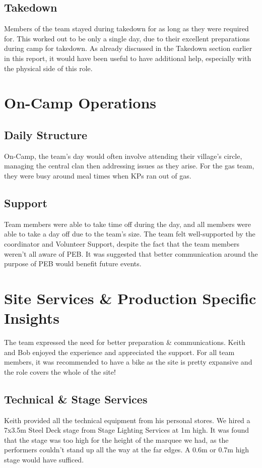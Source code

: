 \subsection{Takedown}
Members of the team stayed during takedown for as long as they were required for. This worked out to be only a single day, due to their excellent preparations during camp for takedown. As already discussed in the Takedown section earlier in this report, it would have been useful to have additional help, especially with the physical side of this role. 

\section{On-Camp Operations}
\subsection{Daily Structure}
On-Camp, the team's day would often involve attending their village's circle, managing the central clan then addressing issues as they arise. For the gas team, they were busy around meal times when KPs ran out of gas. 
\subsection{Support}
Team members were able to take time off during the day, and all members were able to take a day off due to the team's size. The team felt well-supported by the coordinator and Volunteer Support, despite the fact that the team members weren't all aware of PEB. It was suggested that better communication around the purpose of PEB would benefit future events. 

\section{Site Services \& Production Specific Insights}
The team expressed the need for better preparation \& communications. Keith and Bob enjoyed the experience and appreciated the support. For all team members, it was recommended to have a bike as the site is pretty expansive and the role covers the whole of the site! 
\subsection{Technical \& Stage Services}
Keith provided all the technical equipment from his personal stores. We hired a 7x3.5m Steel Deck stage from Stage Lighting Services at 1m high. It was found that the stage was too high for the height of the marquee we had, as the performers couldn't stand up all the way at the far edges. A 0.6m or 0.7m high stage would have sufficed. \\

